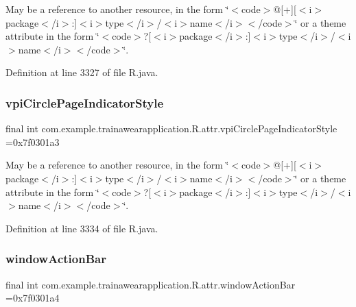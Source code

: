 May be a reference to another resource, in the form \char`\"{}$<$code$>$@\mbox{[}+\mbox{]}\mbox{[}$<$i$>$package$<$/i$>$\+:\mbox{]}$<$i$>$type$<$/i$>$/$<$i$>$name$<$/i$>$$<$/code$>$\char`\"{} or a theme attribute in the form \char`\"{}$<$code$>$?\mbox{[}$<$i$>$package$<$/i$>$\+:\mbox{]}$<$i$>$type$<$/i$>$/$<$i$>$name$<$/i$>$$<$/code$>$\char`\"{}. 

Definition at line 3327 of file R.\+java.

\mbox{\label{classcom_1_1example_1_1trainawearapplication_1_1_r_1_1attr_abac146ef8b937bcdc13f11bc643c307e}} 
\subsubsection{\texorpdfstring{vpiCirclePageIndicatorStyle}{vpiCirclePageIndicatorStyle}}
{\footnotesize\ttfamily final int com.\+example.\+trainawearapplication.\+R.\+attr.\+vpi\+Circle\+Page\+Indicator\+Style =0x7f0301a3\hspace{0.3cm}{\ttfamily [static]}}

May be a reference to another resource, in the form \char`\"{}$<$code$>$@\mbox{[}+\mbox{]}\mbox{[}$<$i$>$package$<$/i$>$\+:\mbox{]}$<$i$>$type$<$/i$>$/$<$i$>$name$<$/i$>$$<$/code$>$\char`\"{} or a theme attribute in the form \char`\"{}$<$code$>$?\mbox{[}$<$i$>$package$<$/i$>$\+:\mbox{]}$<$i$>$type$<$/i$>$/$<$i$>$name$<$/i$>$$<$/code$>$\char`\"{}. 

Definition at line 3334 of file R.\+java.

\mbox{\label{classcom_1_1example_1_1trainawearapplication_1_1_r_1_1attr_a9cf36998626969e21a821ad9fcd1e695}} 
\subsubsection{\texorpdfstring{windowActionBar}{windowActionBar}}
{\footnotesize\ttfamily final int com.\+example.\+trainawearapplication.\+R.\+attr.\+window\+Action\+Bar =0x7f0301a4\hspace{0.3cm}{\ttfamily [static]}}

